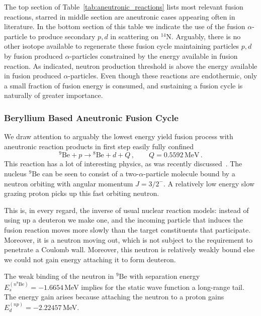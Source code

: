 \documentclass[particles,article,accept,pdftex,moreauthors]{Definitions/mdpi}
\begin{document}
The top section of Table~\ref{tab:aneutronic_reactions} lists most relevant fusion reactions, starred in middle section are aneutronic cases appearing often in literature. In the bottom section of this table we indicate the use of the fusion $\alpha$-particle to produce secondary $p,d$ in scattering on ${}^{14}\mathrm{N}$. Arguably, there is no other isotope available to regenerate these fusion cycle maintaining particles $p,d$ by fusion produced $\alpha$-particles constrained by the energy available in fusion reaction. As indicated, neutron production threshold is above the energy available in fusion produced $\alpha$-particles. Even though these reactions are endothermic, only a small fraction of fusion energy is consumed, and sustaining a fusion cycle is naturally of greater importance. 

\subsubsection{Beryllium Based Aneutronic Fusion Cycle} \label{ssec:Beryl}
We draw attention to arguably the lowest energy yield fusion process with aneutronic reaction products in first step easily fully confined 
\begin{equation}
^9\mathrm{Be}+p\to\! ^8\mathrm{Be}+d + Q \,,\qquad Q=0.5592\,\mathrm{MeV}\,.
\label{eq:9Bep-8Ben}
\end{equation}
This reaction has a lot of interesting physics, as was recently discussed~\cite{Rafelski:2025uio}. The nucleus ${}^9\mathrm{Be}$ can be seen to consist of a two-$\alpha$-particle molecule bound by a neutron orbiting with angular momentum $J=3/2^-$. A relatively low energy slow grazing proton picks up this fast orbiting neutron.

This is, in every regard, the inverse of usual nuclear reaction models: instead of using up a deuteron we make one, and the incoming particle that induces the fusion reaction moves more slowly than the target constituents that participate. Moreover, it is a neutron moving out, which is not subject to the requirement to penetrate a Coulomb wall. Moreover, this neutron is relatively weakly bound else we could not gain energy attaching it to form deuteron.

The weak binding of the neutron in ${}^9\mathrm{Be}$ with separation energy $E_s^{(n^8\mathrm{Be})}=-1.6654$\,MeV implies for the static wave function a long-range tail. The energy gain arises because attaching the neutron to a proton gains $E_d^{(np)}=-2.22457$\,MeV.
\end{document}
